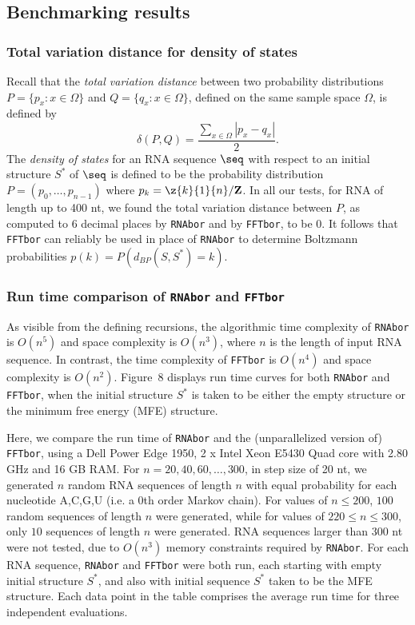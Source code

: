 \subsection*{Benchmarking results}

\subsubsection*{Total variation distance for density of states}

Recall that the {\em total variation distance}
between two probability distributions
$P = \{ p_{x} : x \in \Omega\}$ and
$Q = \{ q_{x} : x \in \Omega\}$, defined on the same sample space $\Omega$, is
defined by
\[
\delta(P,Q) = \frac{\sum_{x \in \Omega} |p_x - q_x|}{2}.
\]
The {\em density of states} for an RNA sequence $\seq$ with respect to
an initial structure $S^*$ of $\seq$ is defined to be the probability
distribution
$P = (p_0,\ldots,p_{n-1})$ where $p_k = \z{k}{1}{n}/{\bf Z}$.
In all our tests, for RNA of length up to 400 nt, we found the total
variation distance between $P$, as computed to 6 decimal places by
{\tt RNAbor} and by {\tt FFTbor}, to be $0$. It follows that {\tt FFTbor}
can reliably be used in place of {\tt RNAbor} to determine Boltzmann
probabilities $p(k) = P\left( d_{BP}(S,S^*)=k \right)$.

\subsubsection*{Run time comparison of {\tt RNAbor} and {\tt FFTbor}}

As visible from the defining recursions, the algorithmic time complexity of
{\tt RNAbor} is $O(n^5)$ and space complexity is $O(n^3)$, where $n$ is
the length of input RNA sequence. In contrast, the time complexity of
{\tt FFTbor} is $O(n^4)$ and space complexity is $O(n^2)$.
Figure~8 displays run time curves for both
{\tt RNAbor} and {\tt FFTbor}, when the initial structure $S^*$ is
taken to be either the empty structure or the minimum free energy
(MFE) structure.

Here, we compare the run time of {\tt RNAbor} \cite{Freyhult.b07} and
the (unparallelized version of) {\tt FFTbor}, using
a Dell Power Edge 1950, 2 x Intel Xeon E5430 Quad
core with 2.80 GHz and 16 GB RAM. For $n = 20,40,60,\ldots, 300$, in step
size of 20 nt, we generated $n$ random RNA sequences of length $n$ with equal
probability for each nucleotide A,C,G,U (i.e. a $0$th order Markov chain).
For values of $n \leq 200$, $100$ random sequences of length
$n$ were generated, while for values of $220 \leq n \leq 300$, only
$10$ sequences of length $n$ were generated.
RNA sequences larger than 300 nt were not tested,
due to $O(n^3)$ memory constraints required by {\tt RNAbor}.
For each RNA sequence, {\tt RNAbor} and {\tt FFTbor} were both run,
each starting with empty initial structure $S^*$, and also
with initial sequence $S^*$ taken to be the MFE structure.
Each data point in the table comprises the average run time for three
independent evaluations.

